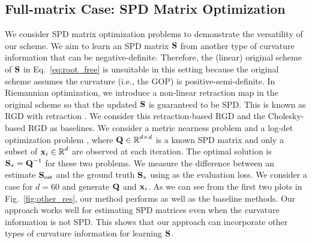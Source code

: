 \vspace{-0.2cm}
\subsection{Full-matrix Case: SPD Matrix Optimization}
\vspace{-0.15cm}
We consider SPD matrix optimization problems to demonstrate the versatility of our scheme.
%
%
We aim to learn an SPD matrix $\mbox{$\mbox{$\mathbf{S}$}$}$ from another type of curvature information that can be negative-definite. Therefore, the (linear) original scheme of $\mbox{$\mbox{$\mathbf{S}$}$}$ in  Eq.~\eqref{eq:root_free}  is unsuitable in this setting because the original scheme assumes the curvature (i.e., the GOP) is positive-semi-definite.
In Riemannian optimization, we introduce a non-linear retraction map
in the original scheme so that the updated $\mbox{$\mbox{$\mathbf{S}$}$}$ is guaranteed to be SPD. This is known as RGD with retraction \citep{absil2009optimization,boumal2014manopt}.
%
We consider this retraction-based RGD \citep{boumal2014manopt} and the Cholesky-based RGD \citep{lin2023simplifying} as baselines. We consider a metric nearness problem \citep{brickell2008metric} 
and a log-det optimization problem \citep{han2021riemannian} 
, where $\mbox{$\mbox{$\mathbf{Q}$}$} \in \mbox{$\mathbb{R}$}^{d \times d}$ is a known SPD matrix and only a subset of $\mbox{$\mbox{$\mathbf{x}$}$}_i \in \mbox{$\mathbb{R}$}^d$ are observed at each iteration. The optimal solution is $\mbox{$\mbox{$\mathbf{S}$}$}_*=\mbox{$\mbox{$\mathbf{Q}$}$}^{-1}$ for these two problems. We measure the difference between an estimate $\mbox{$\mbox{$\mathbf{S}$}$}_\text{est}$ and the ground truth $\mbox{$\mbox{$\mathbf{S}$}$}_*$ using  as the evaluation loss.
We consider a case for $d=60$ and generate $\mbox{$\mbox{$\mathbf{Q}$}$}$ and $\mbox{$\mbox{$\mathbf{x}$}$}_i$.
%
%
As we can see from the first two plots in Fig.~\ref{fig:other_res}, our method performs as well as the baseline methods. Our approach works well for estimating SPD matrices even when the curvature information is not SPD. This shows that our approach can  incorporate other types of curvature information for learning $\mbox{$\mbox{$\mathbf{S}$}$}$.

\vspace{-0.3cm}
